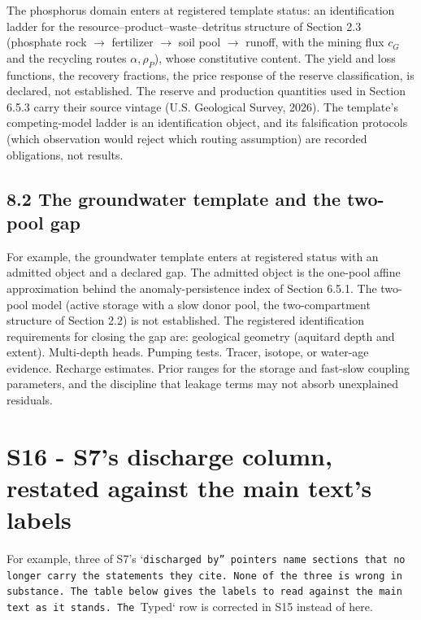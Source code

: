 \documentclass[11pt]{article}
\begin{document}
The phosphorus domain enters at registered template status: an identification ladder for the resource--product--waste--detritus structure of Section 2.3 (phosphate rock \(\rightarrow\) fertilizer \(\rightarrow\) soil pool \(\rightarrow\) runoff, with the mining flux \(c_G\) and the recycling routes \(\alpha, \rho_P\)), whose constitutive content. The yield and loss functions, the recovery fractions, the price response of the reserve classification, is declared, not established. The reserve and production quantities used in Section 6.5.3 carry their source vintage (U.S. Geological Survey, 2026). The template's competing-model ladder is an identification object, and its falsification protocols (which observation would reject which routing assumption) are recorded obligations, not results.

\subsection*{8.2 The groundwater template and the two-pool gap}\label{82-the-groundwater-template-and-the-two-pool-gap}

For example, the groundwater template enters at registered status with an admitted object and a declared gap. The admitted object is the one-pool affine approximation behind the anomaly-persistence index of Section 6.5.1. The two-pool model (active storage with a slow donor pool, the two-compartment structure of Section 2.2) is not established. The registered identification requirements for closing the gap are: geological geometry (aquitard depth and extent). Multi-depth heads. Pumping tests. Tracer, isotope, or water-age evidence. Recharge estimates. Prior ranges for the storage and fast-slow coupling parameters, and the discipline that leakage terms may not absorb unexplained residuals.

\section*{S16 - S7's discharge column, restated against the main text's labels}\label{s16---s7's-discharge-column-restated-against-the-main-text's-labels}

For example, three of S7's `\texttt{discharged b\allowbreak{}y'' pointers\allowbreak{} name sectio\allowbreak{}ns that no l\allowbreak{}onger carry \allowbreak{}the statemen\allowbreak{}ts they cite\allowbreak{}. None of th\allowbreak{}e three is w\allowbreak{}rong in subs\allowbreak{}tance. The t\allowbreak{}able below g\allowbreak{}ives the lab\allowbreak{}els to read \allowbreak{}against the \allowbreak{}main text as\allowbreak{} it stands. \allowbreak{}The }Typed` row is corrected in S15 instead of here.
\end{document}
